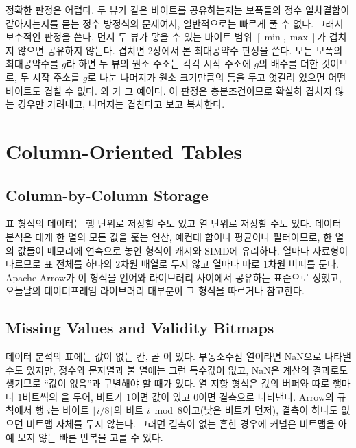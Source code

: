 정확한 판정은 어렵다. 두 뷰가 같은 바이트를 공유하는지는 보폭들의 정수 일차결합이 같아지는지를 묻는 정수 방정식의 문제여서, 일반적으로는 빠르게 풀 수 없다. 그래서 보수적인 판정을 쓴다. 먼저 두 뷰가 닿을 수 있는 바이트 범위 $[\min,\max]$가 겹치지 않으면 공유하지 않는다. 겹치면 2장에서 본 최대공약수 판정을 쓴다. 모든 보폭의 최대공약수를 $g$라 하면 두 뷰의 원소 주소는 각각 시작 주소에 $g$의 배수를 더한 것이므로, 두 시작 주소를 $g$로 나눈 나머지가 원소 크기만큼의 틈을 두고 엇갈려 있으면 어떤 바이트도 겹칠 수 없다. 와 가 그 예이다. 이 판정은 충분조건이므로 확실히 겹치지 않는 경우만 가려내고, 나머지는 겹친다고 보고 복사한다.

\section{Column-Oriented Tables}
\label{sec:columnar}

\subsection{Column-by-Column Storage}

표 형식의 데이터는 행 단위로 저장할 수도 있고 열 단위로 저장할 수도 있다. 데이터 분석은 대개 한 열의 모든 값을 훑는 연산, 예컨대 합이나 평균이나 필터이므로, 한 열의 값들이 메모리에 연속으로 놓인  형식이 캐시와 SIMD에 유리하다. 열마다 자료형이 다르므로 표 전체를 하나의 $2$차원 배열로 두지 않고 열마다 따로 $1$차원 버퍼를 둔다. Apache Arrow가 이 형식을 언어와 라이브러리 사이에서 공유하는 표준으로 정했고, 오늘날의 데이터프레임 라이브러리 대부분이 그 형식을 따르거나 참고한다\cite{arrow-columnar}.

\subsection{Missing Values and Validity Bitmaps}

데이터 분석의 표에는 값이 없는 칸, 곧 이 있다. 부동소수점 열이라면 NaN으로 나타낼 수도 있지만, 정수와 문자열과 불 열에는 그런 특수값이 없고, NaN은 계산의 결과로도 생기므로 ``값이 없음''과 구별해야 할 때가 있다. 열 지향 형식은 값의 버퍼와 따로 행마다 $1$비트씩의 을 두어, 비트가 $1$이면 값이 있고 $0$이면 결측으로 나타낸다. Arrow의 규칙에서 행 $i$는 바이트 $\lfloor i/8\rfloor$의 비트 $i\bmod8$이고(낮은 비트가 먼저), 결측이 하나도 없으면 비트맵 자체를 두지 않는다. 그러면 결측이 없는 흔한 경우에 커널은 비트맵을 아예 보지 않는 빠른 반복을 고를 수 있다.

